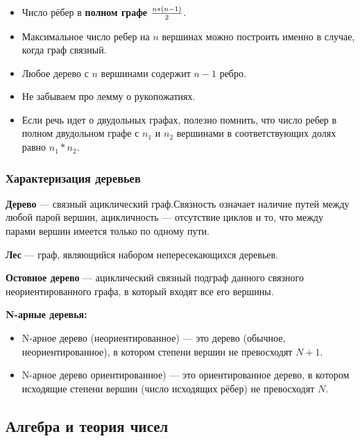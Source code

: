 \documentclass[12pt]{matmex-diploma}
\begin{document}
            \begin{itemize}
                \item Число рёбер в \textbf{полном графе} ${n*(n-1)} \over 2$.
                \item Максимальное число ребер на $n$ вершинах можно построить именно в случае, когда граф связный.
                \item Любое дерево с $n$ вершинами содержит $n-1$ ребро.
                \item Не забываем про лемму о рукопожатиях.
                \item Если речь идет о двудольных графах, полезно помнить, что число ребер в полном двудольном графе с $n_1$ и $n_2$ вершинами в соответствующих долях равно $n_1*n_2$.
            \end{itemize}
            
        \subsubsection*{Характеризация деревьев}    
        
            \textbf{Дерево} — связный ациклический граф.Связность означает наличие путей между любой парой вершин, ацикличность — отсутствие циклов и то, что между парами вершин имеется только по одному пути.
            
            \textbf{Лес} — граф, являющийся набором непересекающихся деревьев.
            
            \textbf{Остовное дерево} — ациклический связный подграф данного связного неориентированного графа, в который входят все его вершины.
            
            \textbf{N-арные деревья:}
            \begin{itemize}
                \item N-арное дерево (неориентированное) — это дерево (обычное, неориентированное), в котором степени вершин не превосходят $N+1$.
                \item N-арное дерево ориентированное) — это ориентированное дерево, в котором исходящие степени вершин (число исходящих рёбер) не превосходят $N$.
            \end{itemize}
        
    \subsection{Алгебра и теория чисел}
        
\end{document}
